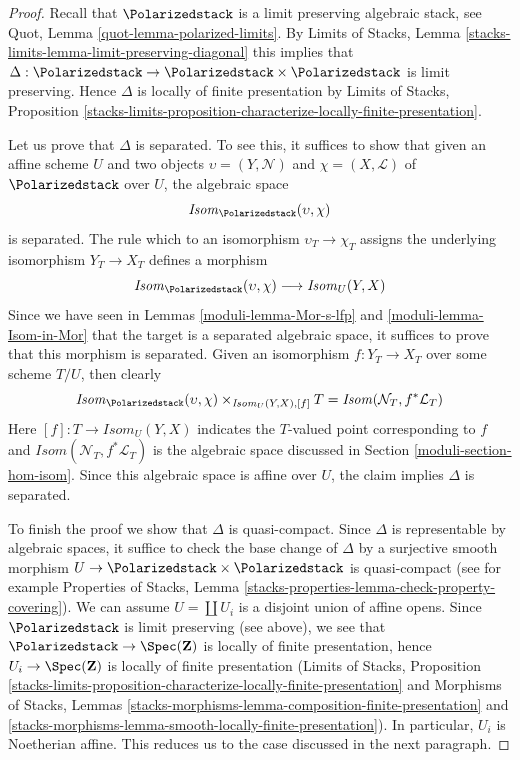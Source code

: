 \begin{proof}

Recall that $\Polarizedstack$ is a limit preserving algebraic stack, see
Quot, Lemma \ref{quot-lemma-polarized-limits}.
By Limits of Stacks, Lemma \ref{stacks-limits-lemma-limit-preserving-diagonal}
this implies that
$\Delta : \Polarizedstack \to \Polarizedstack \times \Polarizedstack$
is limit preserving. Hence $\Delta$ is locally of finite presentation
by Limits of Stacks, Proposition
\ref{stacks-limits-proposition-characterize-locally-finite-presentation}.

\medskip\noindent
Let us prove that $\Delta$ is separated. To see this, it suffices to show
that given an affine scheme $U$ and two objects
$\upsilon = (Y, \mathcal{N})$ and $\chi = (X, \mathcal{L})$
of $\Polarizedstack$ over $U$, the algebraic
space
$$
\mathit{Isom}_{\Polarizedstack}(\upsilon, \chi)
$$
is separated. The rule which to an isomorphism $\upsilon_T \to \chi_T$
assigns the underlying isomorphism $Y_T \to X_T$ defines a morphism
$$
\mathit{Isom}_{\Polarizedstack}(\upsilon, \chi)
\longrightarrow
\mathit{Isom}_U(Y, X)
$$
Since we have seen in Lemmas \ref{moduli-lemma-Mor-s-lfp} and
\ref{moduli-lemma-Isom-in-Mor} that the target is
a separated algebraic space, it suffices to prove that this morphism
is separated. Given an isomorphism $f : Y_T \to X_T$
over some scheme $T/U$, then clearly
$$
\mathit{Isom}_{\Polarizedstack}(\upsilon, \chi)
\times_{\mathit{Isom}_U(Y, X), [f]} T
=
\mathit{Isom}(\mathcal{N}_T, f^*\mathcal{L}_T)
$$
Here $[f] : T \to \mathit{Isom}_U(Y, X)$ indicates the $T$-valued
point corresponding to $f$ and
$\mathit{Isom}(\mathcal{N}_T, f^*\mathcal{L}_T)$
is the algebraic space discussed in Section \ref{moduli-section-hom-isom}.
Since this algebraic space is affine over $U$, the claim implies
$\Delta$ is separated.

\medskip\noindent
To finish the proof we show that $\Delta$ is quasi-compact. Since
$\Delta$ is representable by algebraic spaces, it suffice to check
the base change of $\Delta$ by a surjective smooth morphism
$U \to \Polarizedstack \times \Polarizedstack$ is quasi-compact
(see for example Properties of Stacks, Lemma
\ref{stacks-properties-lemma-check-property-covering}).
We can assume $U = \coprod U_i$ is a disjoint union of affine opens.
Since $\Polarizedstack$ is limit preserving (see above), we
see that $\Polarizedstack \to \Spec(\mathbf{Z})$ is locally of
finite presentation, hence $U_i \to \Spec(\mathbf{Z})$ is
locally of finite presentation
(Limits of Stacks, Proposition
\ref{stacks-limits-proposition-characterize-locally-finite-presentation}
and Morphisms of Stacks, Lemmas
\ref{stacks-morphisms-lemma-composition-finite-presentation} and
\ref{stacks-morphisms-lemma-smooth-locally-finite-presentation}).
In particular, $U_i$ is Noetherian affine. This reduces us to the
case discussed in the next paragraph.


\end{proof}
